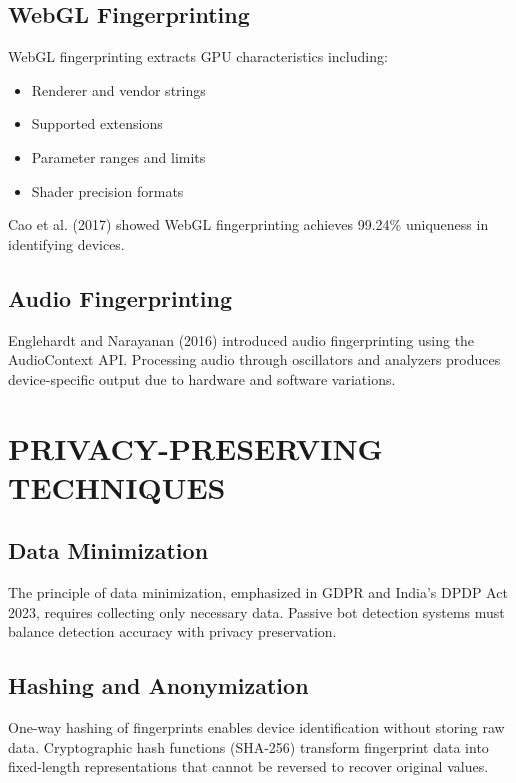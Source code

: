 \subsection{WebGL Fingerprinting}

WebGL fingerprinting extracts GPU characteristics including:
\begin{itemize}
    \item Renderer and vendor strings
    \item Supported extensions
    \item Parameter ranges and limits
    \item Shader precision formats
\end{itemize}

Cao et al. (2017) showed WebGL fingerprinting achieves 99.24\% uniqueness in identifying devices.

\subsection{Audio Fingerprinting}

Englehardt and Narayanan (2016) introduced audio fingerprinting using the AudioContext API. Processing audio through oscillators and analyzers produces device-specific output due to hardware and software variations.

\section{PRIVACY-PRESERVING TECHNIQUES}

\subsection{Data Minimization}

The principle of data minimization, emphasized in GDPR and India's DPDP Act 2023, requires collecting only necessary data. Passive bot detection systems must balance detection accuracy with privacy preservation.

\subsection{Hashing and Anonymization}

One-way hashing of fingerprints enables device identification without storing raw data. Cryptographic hash functions (SHA-256) transform fingerprint data into fixed-length representations that cannot be reversed to recover original values.

